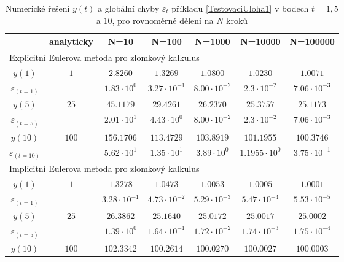 \documentclass[a4paper,12pt,twoside]{article}
\theoremstyle{definition}
\theoremstyle{remark}
\numberwithin{equation}{section}
\numberwithin{table}{section}
\numberwithin{figure}{section}
\begin{document}
	\begin{table}[h!]
	\centering
	\caption{Numerické řešení $y\left(t\right)$ a globální chyby $\varepsilon_{t}$ příkladu \ref{TestovaciUloha1} v bodech $t = 1, 5$ a $10$, pro rovnoměrné dělení na $N$ kroků}
	\label{tab:tabulkaTestovacíÚloha(1)}
	\begin{tabular}{|c||c|c|c|c|c|c|}
		\hline
		& analyticky & N=10 & N=100 & N=1000 & N=10000 & N=100000 \\
		\hline\hline
		
		\multicolumn{7}{|l|}{Explicitní Eulerova metoda pro zlomkový kalkulus} \\
		\hline
		$y\left(1\right)$ & $1$ & $2.8260$ & $1.3269$ & $1.0800$ & $1.0230$ & $1.0071$  \\
		\hline
		$\varepsilon_{\left(t=1\right)}$ &  & $1.83 \cdot 10^{0}$ & $3.27 \cdot 10^{-1}$ & $8.00 \cdot 10^{-2}$ & $2.3\cdot 10^{-2}$ & $7.06 \cdot 10^{-3}$ \\
		\hline
		$y\left(5\right)$ & $25$ & $45.1179$ & $29.4261$ & $26.2370$ & $25.3757$ & $25.1173$  \\
		\hline
		$\varepsilon_{\left(t=5\right)}$ & & $ 2.01 \cdot 10^{1}$ & $4.43 \cdot 10^{0}$ & $8.00 \cdot 10^{-2}$ & $2.3\cdot 10^{-2}$ & $7.06 \cdot 10^{-3}$ \\
		\hline
		$y\left(10\right)$ & $100$ & $156.1706$ & $113.4729$& $103.8919$ & $101.1955$ & $100.3746$  \\
		\hline
		$\varepsilon_{\left(t=10\right)}$ & & $ 5.62 \cdot 10^{1}$ & $1.35 \cdot 10^{1}$ & $3.89 \cdot 10^{0}$ & $1.1955\cdot 10^{0}$ & $3.75 \cdot 10^{-1}$ \\
		\hline\hline
		\multicolumn{7}{|l|}{Implicitní Eulerova metoda pro zlomkový kalkulus} \\
		\hline
		$y\left(1\right)$ & $1$ & $1.3278$ & $1.0473$ & $1.0053$ & $1.0005$ & $1.0001$  \\
		\hline
		$\varepsilon_{\left(t=1\right)}$ &  & $3.28 \cdot 10^{-1}$ & $4.73 \cdot 10^{-2}$ & $5.29 \cdot 10^{-3}$ & $5.47\cdot 10^{-4}$ & $5.53\cdot 10^{-5}$ \\
		\hline
		$y\left(5\right)$ & $25$ & $26.3862$ & $25.1640$ & $25.0172$ & $25.0017$ & $25.0002$  \\
		\hline
		$\varepsilon_{\left(t=5\right)}$ & & $ 1.39 \cdot 10^{0}$ & $1.64 \cdot 10^{-1}$ & $1.72 \cdot 10^{-2}$ & $1.74\cdot 10^{-3}$ & $1.75 \cdot 10^{-4}$ \\
		\hline
		$y\left(10\right)$ & $100$ & $102.3342$ & $100.2614$ & $100.0270$ & $100.0027$ & $100.0003$  \\

\end{tabular}
\end{table}
\end{document}
